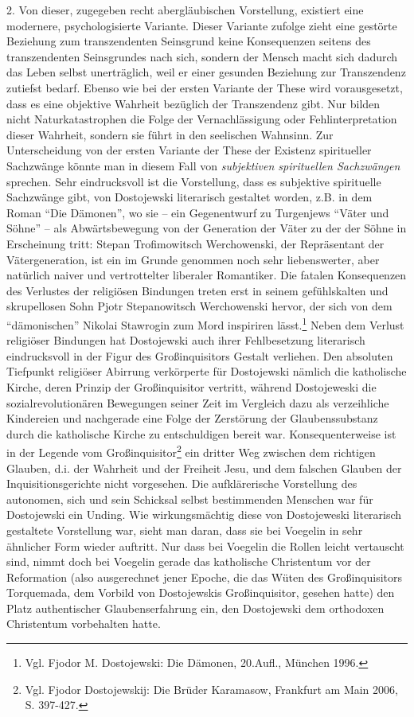 2. Von dieser, zugegeben recht abergläubischen Vorstellung, existiert eine
modernere, psychologisierte Variante. Dieser Variante zufolge zieht eine
gestörte Beziehung zum transzendenten Seinsgrund keine Konsequenzen seitens
des transzendenten Seinsgrundes nach sich, sondern der Mensch macht sich
dadurch das Leben selbst unerträglich, weil er einer gesunden Beziehung zur
Transzendenz zutiefst bedarf. Ebenso wie bei der ersten Variante der These
wird vorausgesetzt, dass es eine objektive Wahrheit bezüglich der Transzendenz
gibt. Nur bilden nicht Naturkatastrophen die Folge der Vernachlässigung oder
Fehlinterpretation dieser Wahrheit, sondern sie führt in den seelischen
Wahnsinn. Zur Unterscheidung von der ersten Variante der These der Existenz
spiritueller Sachzwänge könnte man in diesem Fall von {\em subjektiven
  spirituellen Sachzwängen} sprechen. Sehr eindrucksvoll ist die Vorstellung,
dass es subjektive spirituelle Sachzwänge gibt, von Dostojewski literarisch
gestaltet worden, z.B. in dem Roman "`Die Dämonen"', wo sie -- ein
Gegenentwurf zu Turgenjews "`Väter und Söhne"' -- als Abwärtsbewegung von der
Generation der Väter zu der der Söhne in Erscheinung tritt: Stepan
Trofimowitsch Werchowenski, der Repräsentant der Vätergeneration, ist ein im
Grunde genommen noch sehr liebenswerter, aber natürlich naiver und
vertrottelter liberaler Romantiker. Die fatalen Konsequenzen des Verlustes der
religiösen Bindungen treten erst in seinem gefühlskalten und skrupellosen Sohn
Pjotr Stepanowitsch Werchowenski hervor, der sich von dem "`dämonischen"'
Nikolai Stawrogin zum Mord inspiriren lässt.\footnote{Vgl. Fjodor M.
  Dostojewski: Die Dämonen, 20.Aufl., München 1996.}  Neben dem Verlust
religiöser Bindungen hat Dostojewski auch ihrer Fehlbesetzung literarisch
eindrucksvoll in der Figur des Großinquisitors Gestalt verliehen.  Den
absoluten Tiefpunkt religiöser Abirrung verkörperte für Dostojewski nämlich
die katholische Kirche, deren Prinzip der Großinquisitor vertritt, während
Dostojeweski die sozialrevolutionären Bewegungen seiner Zeit im Vergleich dazu
als verzeihliche Kindereien und nachgerade eine Folge der Zerstörung der
Glaubenssubstanz durch die katholische Kirche zu entschuldigen bereit war.
Konsequenterweise ist in der Legende vom Großinquisitor\footnote{Vgl. Fjodor
  Dostojewskij: Die Brüder Karamasow, Frankfurt am Main 2006, S. 397-427.} ein
dritter Weg zwischen dem richtigen Glauben, d.i. der Wahrheit und der Freiheit
Jesu, und dem falschen Glauben der Inquisitionsgerichte nicht vorgesehen. Die
aufklärerische Vorstellung des autonomen, sich und sein Schicksal selbst
bestimmenden Menschen war für Dostojewski ein Unding. Wie wirkungsmächtig
diese von Dostojeweski literarisch gestaltete Vorstellung war, sieht man
daran, dass sie bei Voegelin in sehr ähnlicher Form wieder auftritt.  Nur dass
bei Voegelin die Rollen leicht vertauscht sind, nimmt doch bei Voegelin gerade
das katholische Christentum vor der Reformation (also ausgerechnet jener
Epoche, die das Wüten des Großinquisitors Torquemada, dem Vorbild von
Dostojewskis Großinquisitor, gesehen hatte) den Platz authentischer
Glaubenserfahrung ein, den Dostojewski dem orthodoxen Christentum vorbehalten
hatte.

